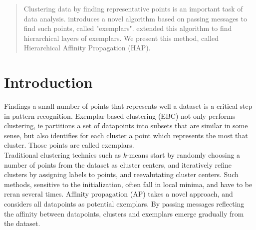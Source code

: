 \documentclass{ipol}
\begin{document}
\begin{abstract}

Clustering data by finding representative points is an important task of data
analysis. \cite{frey07affinitypropagation} introduces a novel algorithm based
on passing messages to find such points, called "exemplars". \cite{hap}
extended this algorithm to find hierarchical layers of exemplars. We present
this method, called Hierarchical Affinity Propagation (HAP).

\end{abstract}

\begin{ipolCode}
\end{ipolCode}

\begin{ipolSupp}
\end{ipolSupp}

\section{Introduction}

Findings a small number of points that represents well a dataset is a critical
step in pattern recognition. Exemplar-based clustering (EBC) not only performs
clustering, ie partitions a set of datapoints into subsets that are similar in
some sense, but also identifies for each cluster a point which represents the
most that cluster. Those points are called exemplars.\\

Traditional clustering technics such as $k$-means start by randomly choosing a
number of points from the dataset as cluster centers, and iteratively refine
clusters by assigning labels to points, and reevalutating cluster centers.
Such methods, sensitive to the initialization, often fall in local minima, and
have to be reran several times. Affinity propagation (AP) takes a novel
approach, and considers all datapoints as potential exemplars. By passing
messages reflecting the affinity between datapoints, clusters and exemplars
emerge gradually from the dataset. \\
\end{document}
